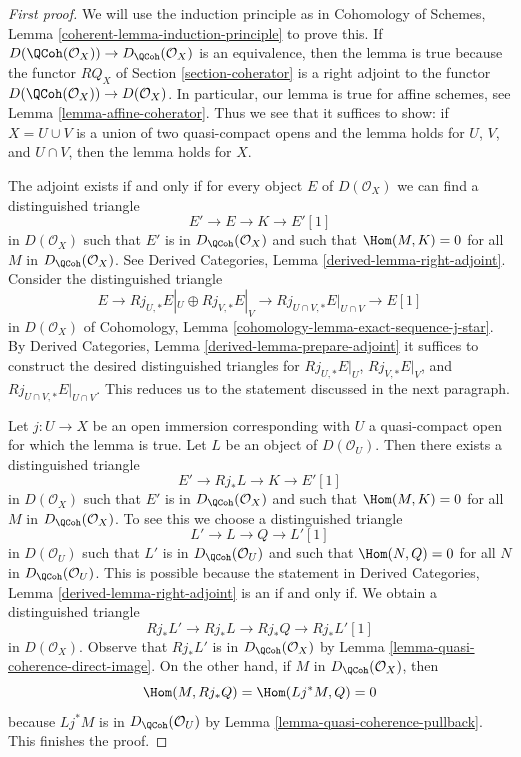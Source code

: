 \begin{proof}[First proof]
We will use the induction principle as in
Cohomology of Schemes, Lemma \ref{coherent-lemma-induction-principle}
to prove this. If $D(\QCoh(\mathcal{O}_X)) \to D_\QCoh(\mathcal{O}_X)$
is an equivalence, then the lemma is true because the functor
$RQ_X$ of Section \ref{section-coherator} is a right adjoint to the functor
$D(\QCoh(\mathcal{O}_X)) \to D(\mathcal{O}_X)$.
In particular, our lemma is true for affine schemes, see
Lemma \ref{lemma-affine-coherator}.
Thus we see that it suffices to show: if $X = U \cup V$
is a union of two quasi-compact opens and the
lemma holds for $U$, $V$, and $U \cap V$, then the lemma holds for $X$.

\medskip\noindent
The adjoint exists if and only if for every object $E$ of
$D(\mathcal{O}_X)$ we can find a distinguished triangle
$$
E' \to E \to K \to E'[1]
$$
in $D(\mathcal{O}_X)$
such that $E'$ is in $D_\QCoh(\mathcal{O}_X)$ and such that
$\Hom(M, K) = 0$ for all $M$ in $D_\QCoh(\mathcal{O}_X)$. See
Derived Categories, Lemma \ref{derived-lemma-right-adjoint}.
Consider the distinguished triangle
$$
E \to Rj_{U, *}E|_U \oplus Rj_{V, *}E|_V \to
Rj_{U \cap V, *}E|_{U \cap V} \to E[1]
$$
in $D(\mathcal{O}_X)$ of
Cohomology, Lemma \ref{cohomology-lemma-exact-sequence-j-star}.
By Derived Categories, Lemma \ref{derived-lemma-prepare-adjoint}
it suffices to construct the desired distinguished triangles
for $Rj_{U, *}E|_U$, $Rj_{V, *}E|_V$, and
$Rj_{U \cap V, *}E|_{U \cap V}$. This reduces us to the statement
discussed in the next paragraph.

\medskip\noindent
Let $j : U \to X$ be an open immersion corresponding with $U$ a quasi-compact
open for which the lemma is true. Let $L$ be an object of $D(\mathcal{O}_U)$.
Then there exists a distinguished triangle
$$
E' \to Rj_*L \to K \to E'[1]
$$
in $D(\mathcal{O}_X)$
such that $E'$ is in $D_\QCoh(\mathcal{O}_X)$ and such that
$\Hom(M, K) = 0$ for all $M$ in $D_\QCoh(\mathcal{O}_X)$.
To see this we choose a distinguished triangle
$$
L' \to L \to Q \to L'[1]
$$
in $D(\mathcal{O}_U)$ such that $L'$ is in $D_\QCoh(\mathcal{O}_U)$
and such that $\Hom(N, Q) = 0$ for all $N$ in $D_\QCoh(\mathcal{O}_U)$.
This is possible because the statement in
Derived Categories, Lemma \ref{derived-lemma-right-adjoint}
is an if and only if.
We obtain a distinguished triangle
$$
Rj_*L' \to Rj_*L \to Rj_*Q \to Rj_*L'[1]
$$
in $D(\mathcal{O}_X)$. Observe that $Rj_*L'$ is in $D_\QCoh(\mathcal{O}_X)$
by Lemma \ref{lemma-quasi-coherence-direct-image}.
On the other hand, if $M$ in $D_\QCoh(\mathcal{O}_X)$, then
$$
\Hom(M, Rj_*Q) = \Hom(Lj^*M, Q) = 0
$$
because $Lj^*M$ is in $D_\QCoh(\mathcal{O}_U)$ by
Lemma \ref{lemma-quasi-coherence-pullback}.
This finishes the proof.
\end{proof}

